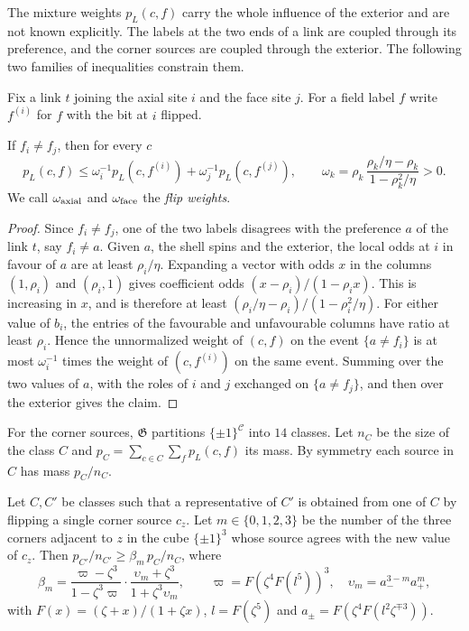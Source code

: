 The mixture weights $p_L(c,f)$ carry the whole influence of the exterior and are not known explicitly. The labels at the two ends of a link are coupled through its preference, and the corner sources are coupled through the exterior. The following two families of inequalities constrain them.

Fix a link $t$ joining the axial site $i$ and the face site $j$. For a field label $f$ write $f^{(i)}$ for $f$ with the bit at $i$ flipped.

\begin{lemma}\label{lem:bridge}
If $f_i\ne f_j$, then for every $c$
\[
 p_L(c,f)\le\omega_i^{-1}p_L(c,f^{(i)})+\omega_j^{-1}p_L(c,f^{(j)}),\qquad
 \omega_k=\rho_k\,\frac{\rho_k/\eta-\rho_k}{1-\rho_k^2/\eta}>0 .
\]
We call $\omega_{\rm axial}$ and $\omega_{\rm face}$ the \emph{flip weights}.
\end{lemma}

\begin{proof}
Since $f_i\ne f_j$, one of the two labels disagrees with the preference $a$ of the link $t$, say $f_i\ne a$. Given $a$, the shell spins and the exterior, the local odds at $i$ in favour of $a$ are at least $\rho_i/\eta$. Expanding a vector with odds $x$ in the columns $(1,\rho_i)$ and $(\rho_i,1)$ gives coefficient odds $(x-\rho_i)/(1-\rho_ix)$. This is increasing in $x$, and is therefore at least $(\rho_i/\eta-\rho_i)/(1-\rho_i^2/\eta)$. For either value of $b_i$, the entries of the favourable and unfavourable columns have ratio at least $\rho_i$. Hence the unnormalized weight of $(c,f)$ on the event $\{a\ne f_i\}$ is at most $\omega_i^{-1}$ times the weight of $(c,f^{(i)})$ on the same event. Summing over the two values of $a$, with the roles of $i$ and $j$ exchanged on $\{a\ne f_j\}$, and then over the exterior gives the claim.
\end{proof}

For the corner sources, $\mathfrak G$ partitions $\{\pm1\}^{\mathcal C}$ into $14$ classes. Let $n_C$ be the size of the class $C$ and $p_C=\sum_{c\in C}\sum_fp_L(c,f)$ its mass. By symmetry each source in $C$ has mass $p_C/n_C$.

\begin{lemma}\label{lem:classodds}
Let $C,C'$ be classes such that a representative of $C'$ is obtained from one of $C$ by flipping a single corner source $c_z$. Let $m\in\{0,1,2,3\}$ be the number of the three corners adjacent to $z$ in the cube $\{\pm1\}^3$ whose source agrees with the new value of $c_z$. Then $p_{C'}/n_{C'}\ge\beta_m\,p_C/n_C$, where
\[
 \beta_m=\frac{\varpi-\zeta^3}{1-\zeta^3\varpi}\cdot\frac{\upsilon_m+\zeta^3}{1+\zeta^3\upsilon_m},\qquad
 \varpi=F(\zeta^4F(l^5))^3,\quad \upsilon_m=a_-^{3-m}a_+^m,
\]
with $F(x)=(\zeta+x)/(1+\zeta x)$, $l=F(\zeta^5)$ and $a_\pm=F(\zeta^4F(l^2\zeta^{\mp3}))$.
\end{lemma}


